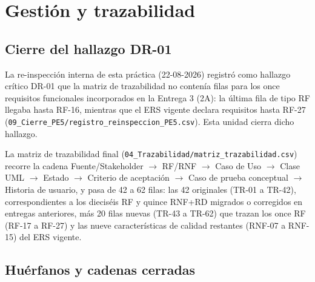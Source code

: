 \section{Gestión y trazabilidad}
\label{sec:gestion-trazabilidad}

\subsection{Cierre del hallazgo DR-01}
\label{sec:cierre-dr01}

La re-inspección interna de esta práctica (22-08-2026) registró como hallazgo crítico DR-01 que
la matriz de trazabilidad no contenía filas para los once requisitos funcionales incorporados en
la Entrega 3 (2A): la última fila de tipo RF llegaba hasta RF-16, mientras que el ERS vigente
declara requisitos hasta RF-27
(\texttt{09\_Cierre\_PE5/registro\_reinspeccion\_PE5.csv}). Esta unidad cierra dicho hallazgo.

La matriz de trazabilidad final (\texttt{04\_Trazabilidad/matriz\_trazabilidad.csv}) recorre la
cadena Fuente/Stakeholder $\rightarrow$ RF/RNF $\rightarrow$ Caso de Uso $\rightarrow$ Clase UML
$\rightarrow$ Estado $\rightarrow$ Criterio de aceptación $\rightarrow$ Caso de prueba conceptual
$\rightarrow$ Historia de usuario, y pasa de 42 a 62 filas: las 42 originales (TR-01 a TR-42),
correspondientes a los dieciséis RF y quince RNF+RD migrados o corregidos en entregas anteriores,
más 20 filas nuevas (TR-43 a TR-62) que trazan los once RF (RF-17 a RF-27) y las nueve
características de calidad restantes (RNF-07 a RNF-15) del ERS vigente.

\subsection{Huérfanos y cadenas cerradas}
\label{sec:huerfanos}

